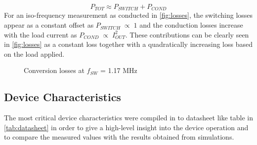 \begin{equation}
    P_{TOT} \approx P_{SWITCH} + P_{COND}
\end{equation}
\label{eq:PLoss}
For an iso-frequency measurement as conducted in \autoref{fig:losses}, the switching losses appear as a constant offset as $P_{SWITCH}\;\propto\;1$ and the conduction losses increase with the load current as $P_{COND}\;\propto\;I_{OUT}^2$. These contributions can be clearly seen in \autoref{fig:losses} as a constant loss together with a quadratically increasing loss based on the load applied.

\begin{figure}[h]
    \centering
    
    \caption{Conversion losses at $f_{SW}$ = 1.17 MHz}
    \label{fig:losses}
\end{figure}
\clearpage

\subsection{Device Characteristics}
\label{sec:characteristics}
The most critical device characteristics were compiled in to datasheet like table in \autoref{tab:datasheet} in order to give a high-level insight into the device operation and to compare the measured values with the results obtained from simulations.



